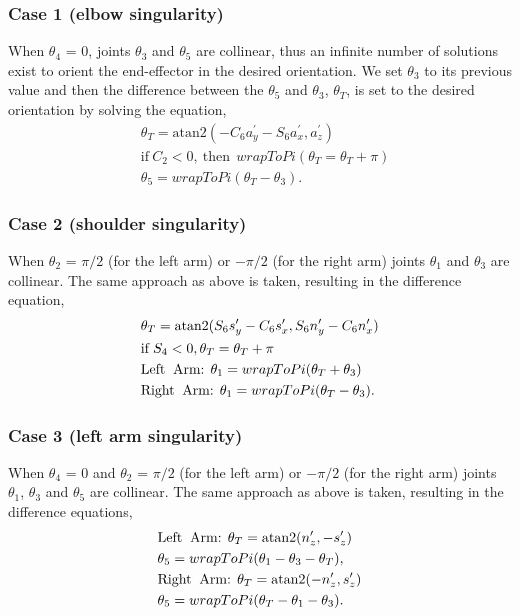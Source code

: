 \documentclass[letterpaper, 10 pt, conference]{IEEEtran}
\providecommand{\atan}{\mathrm{atan2}} %
\begin{document}
\subsubsection{Case 1 (elbow singularity)} When $\theta_4$ = 0, joints $\theta_3$ and $\theta_5$ are collinear, thus an infinite number of solutions exist to orient the end-effector in the desired orientation. We set $\theta_3$ to its previous value and then the difference between the $\theta_5$ and $\theta_3$, $\theta_T$, is set to the desired orientation by solving the equation,
\begin{align}
&	\theta_T = \atan(-C_6a_y^\prime - S_6a_x^\prime, a_z^\prime) \nonumber \\
&	\mathrm{if}\: C_2 < 0,\:\mathrm{ then~}\: wrapToPi(\theta_T = \theta_T + \pi) \nonumber \\
&	\theta_5 = wrapToPi(\theta_T - \theta_3). \nonumber
\end{align}

\subsubsection{Case 2 (shoulder singularity)} When $\theta_2$ = $\pi/2$ (for the left arm) or $-\pi/2$ (for the right arm) joints $\theta_1$ and $\theta_3$ are collinear. The same approach as above is taken, resulting in the difference equation,
\begin{align}
&	\theta_T = \atan(S_6s_y^\prime - C_6s_x^\prime, S_6n_y^\prime - C_6n_x^\prime) \nonumber \\
&	\mathrm{if}\: S_4 < 0, \theta_T = \theta_T + \pi \nonumber \\
&	\text{Left \:Arm:  } \theta_1 = wrapToPi(\theta_T + \theta_3) \nonumber \\
&	\text{Right \:Arm:  } \theta_1 = wrapToPi(\theta_T - \theta_3). \nonumber
\end{align}

\subsubsection{Case 3 (left arm singularity)} When $\theta_4$ = 0 and $\theta_2$ = $\pi/2$ (for the left arm) or $-\pi/2$ (for the right arm) joints $\theta_1$, $\theta_3$ and $\theta_5$ are collinear. The same approach as above is taken, resulting in the difference equations,
\begin{align}
&	\text{Left \:Arm:  } \theta_T = \atan(n_z^\prime, -s_z^\prime) \nonumber \\
&	\theta_5 = wrapToPi(\theta_1 - \theta_3 - \theta_T),\nonumber \\
&	\text{Right \:Arm: } \theta_T = \atan(-n_z^\prime, s_z^\prime) \nonumber \\
&	\theta_5 = wrapToPi(\theta_T - \theta_1 - \theta_3).
\end{align}
\end{document}
